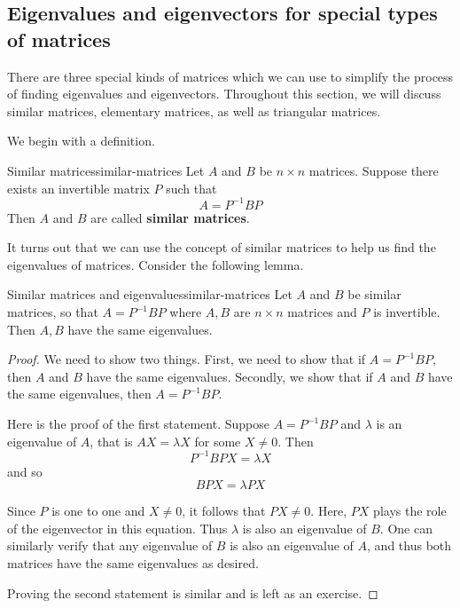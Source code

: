 \subsection{Eigenvalues and eigenvectors for special types of matrices}

There are three special kinds of matrices which we can use to simplify the process of finding eigenvalues and eigenvectors. 
Throughout this section, we will discuss similar matrices, elementary matrices, as well as triangular matrices. 

We begin with a definition.

\begin{definition}{Similar matrices}{similar-matrices}
Let $A$ and $B$ be $n \times n$ matrices. Suppose there exists an invertible matrix $P$ such that 
\begin{equation*}
A = P^{-1}BP
\end{equation*}
Then $A$ and $B$ are called \textbf{similar matrices}.
\end{definition}

It turns out that we can use the concept of similar matrices to help us find the eigenvalues
of matrices. Consider the following lemma.

\begin{lemma}{Similar matrices and eigenvalues}{similar-matrices}
Let $A$ and $B$ be similar matrices, so that $A=P^{-1}BP$ where $A,B$ are $n\times n$ matrices and $P$ is invertible. Then $A,B$ have the
same eigenvalues.
\end{lemma}

\begin{proof}
We need to show two things. First, we need to show that if
$A=P^{-1}BP$, then $A$ and $B$ have the same eigenvalues.  Secondly,
we show that if $A$ and $B$ have the same eigenvalues, then
$A=P^{-1}BP$.

Here is the proof of the first statement. 
Suppose $A = P^{-1}BP$ and $\lambda$ is an eigenvalue of $A$, that is $AX=\lambda X$ for some $X\neq 0.$ Then
\begin{equation*}
P^{-1}BPX=\lambda X
\end{equation*}
and so
\begin{equation*}
BPX=\lambda PX
\end{equation*}

Since $P$ is one to one and $X \neq 0$, it follows that $PX \neq
0$. Here, $PX$ plays the role of the eigenvector in this equation.
Thus $\lambda$ is also an eigenvalue of $B$. One can similarly verify
that any eigenvalue of $B$ is also an eigenvalue of $A$, and thus both
matrices have the same eigenvalues as desired.

Proving the second statement is similar and is left as an exercise. 
\end{proof}

